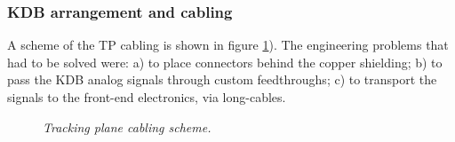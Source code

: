 \subsubsection*{KDB arrangement and cabling}
\label{sec:DB}

A scheme of the TP cabling is shown in 
figure \ref{fig:cabling:scheme}). The engineering problems that had to be solved were: a) to place connectors behind the copper shielding; b) to pass the KDB analog signals through custom feedthroughs; c) to transport the signals to the front-end electronics, via long-cables.  

\begin{figure}[hpt!]
    \bigskip
    \begin{center}\leavevmode
        \caption{\textit{Tracking plane cabling scheme.}}
        \label{fig:cabling:scheme}
    \end{center}
\end{figure}






